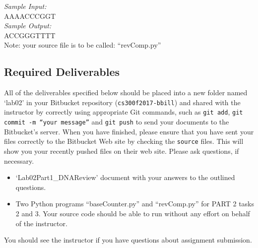 \noindent \emph{ Sample Input: } \\
AAAACCCGGT \\
\emph{Sample Output: } \\
\noindent
ACCGGGTTTT\\
\noindent
Note: your source file is to be called: ``revComp.py''

\vspace*{-.2in}
\subsection*{Required Deliverables}
\vspace*{-.1in}
All of the deliverables specified below should be placed into a new folder named `lab02' in your Bitbucket repository ({\tt cs300f2017-bbill})  and shared with the instructor by correctly using  appropriate Git commands, such as {\tt git add}, {\tt git commit -m ``your message''} and {\tt git push} to send your documents to the Bitbucket's server. When you have finished, please ensure that you have sent your files correctly to the Bitbucket Web site by checking the {\tt source} files. This will show you your recently pushed files on their web site. Please ask questions, if necessary.
\color{red}

\begin{itemize}
	\item `Lab02Part1\_DNAReview' document with your answers to the outlined questions.
	\item Two Python programs ``baseCounter.py'' and ``revComp.py'' for PART 2 tasks 2 and 3. Your source code should be able to run without any effort on behalf of the instructor.
\end{itemize}
\color{black}

\noindent You should see the instructor if you have questions about assignment submission.

